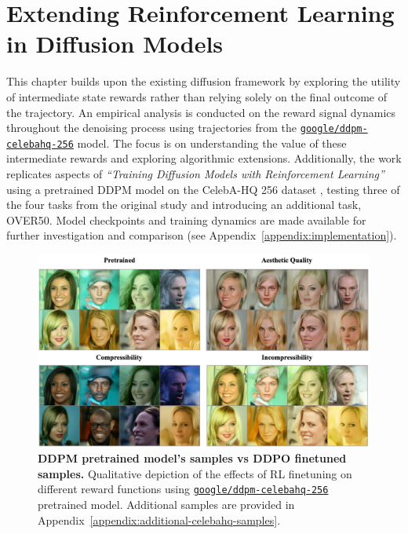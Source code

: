 \chapter{Extending Reinforcement Learning in Diffusion Models}



This chapter builds upon the existing diffusion framework by exploring the utility of intermediate state rewards rather than relying solely on the final outcome of the trajectory. An empirical analysis is conducted on the reward signal dynamics throughout the denoising process using trajectories from the 
\href{https://huggingface.co/google/ddpm-celebahq-256}{\texttt{\texttt{google/ddpm-celebahq-256}}} model. The focus is on understanding the value of these intermediate rewards and exploring algorithmic extensions. Additionally, the work replicates aspects of \textit{``Training Diffusion Models with Reinforcement Learning''} \cite{black2023training} using a pretrained DDPM model on the CelebA-HQ 256 dataset \cite{karras2017progressive}, testing three of the four tasks from the original study and introducing an additional task, OVER50. Model checkpoints and training dynamics are made available for further investigation and comparison (see Appendix~\ref{appendix:implementation}). 

\begin{figure}[ht]
  \centering
  \includegraphics[scale=0.72]{img/results/visual-comparison-results-200dpi.png}
  \vspace{-4pt}  %
  \captionsetup{width=\textwidth} %
  \caption{\textbf{DDPM pretrained model's samples vs DDPO finetuned samples.} Qualitative depiction of the effects of RL finetuning on different reward functions using \href{https://huggingface.co/google/ddpm-celebahq-256}{\texttt{\texttt{google/ddpm-celebahq-256}}}
  pretrained model. Additional samples are provided in Appendix~\ref{appendix:additional-celebahq-samples}.}
  \label{fig:visual-comparison-ddpo}
\end{figure}

